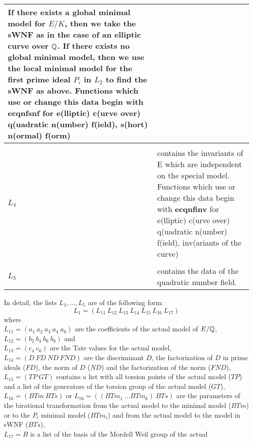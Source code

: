 \begin{center}
\begin{tabular}{|p{0.3in}|p{5.2in}|}
        If there exists a global minimal model for $E/K$, then we take the
        sWNF as in the case of an elliptic curve over $\mbox{$\mathbb Q$}$. If there exists
        no global minimal model, then we use the local minimal model for the
        first prime ideal $P_i$ in $L_2$ to find the sWNF as above. \newline
        Functions which use or change this data begin with {\bf ecqnfsnf} for \newline
        e(lliptic) c(urve over) q(uadratic n(umber) f(ield), s(hort) n(ormal) 
        f(orm) \\[1.5ex]
\hline & \\[-1.3ex]
$L_4$ & contains the invariants of E which are independent on the special 
        model. Functions which use or change this data begin with {\bf ecqnfinv} for \newline
        e(lliptic) c(urve over) q(uadratic n(umber) f(ield), inv(ariants of the curve) \\[1.5ex]
\hline & \\[-1.3ex]
$L_5$ & contains the data of the quadratic number field.  \\[1.5ex]
\hline
\end{tabular}
\end{center}
\newpage
In detail, the lists $L_1,\ldots,L_5$ are of the following form:
\leer
$$
        L_1 = (L_{11}\  L_{12}\  L_{13}\  L_{14}\  L_{15}\  L_{16}\  L_{17})
$$
where \\
$L_{11} = (a_1\  a_2\  a_3\  a_4\ a_6)$ are the coefficients of the actual model
of $E/\mbox{$\mathbb Q$}$, \\ 
$L_{12} = (b_2\  b_4\  b_6\  b_8)$ and \\
$L_{13} = (c_4\  c_6)$ are the Tate 
values for the actual model, \\
$L_{14} = (D\  FD\ ND\ FND)$ are the discriminant $D$, the factorization 
of $D$ in prime ideals ($FD$), the norm of $D$ ($ND$) and the factorization of 
the norm ($FND$), \\ 
$L_{15} = (TP\  GT)$ contains a list with all torsion points of the actual model 
($TP$) and a list of the generators of the torsion group of the actual model
($GT$), \\
$L_{16} = (BTm\  BTs)$ or $L_{16} = ((BTm_1\ \ldots BTm_k)\  BTs)$ 
are the parameters of the birational transformation from the actual model
to the minimal model ($BTm$) or to the $P_i$ minimal model ($BTm_i$) and from 
the actual model to the model in sWNF ($BTs$), \\
$L_{17} = B$ is a list of the basis of the Mordell Weil group of the actual 
